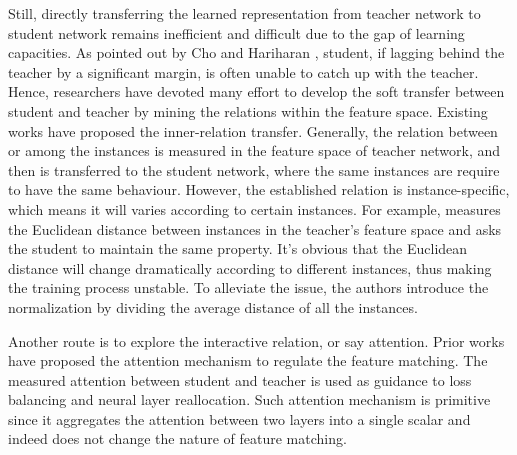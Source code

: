 \documentclass[10pt,twocolumn,letterpaper]{article}
\begin{document}
Still, directly transferring the learned representation from teacher network to student network remains inefficient and difficult due to the gap of learning capacities. As pointed out by Cho and Hariharan \cite{Cho2019OnTE}, student, if lagging behind the teacher by a significant margin, is often unable to catch up with the teacher. Hence, researchers have devoted many effort to develop the soft transfer between student and teacher by mining the relations within the feature space. Existing works \cite{Park2019RelationalKD, Passalis2018LearningDR,Peng2019CorrelationCF,Tung2019SimilarityPreservingKD} have proposed the inner-relation transfer. Generally, the relation between or among the instances is measured in the feature space of teacher network, and then is transferred to the student network, where the same instances are require to have the same behaviour. However, the established relation is instance-specific, which means it will varies according to certain instances. For example, \cite{Park2019RelationalKD} measures the Euclidean distance between instances in the teacher's feature space and asks the student to maintain the same property. It's obvious that the Euclidean distance will change dramatically according to different instances, thus making the training process unstable. To alleviate the issue, the authors introduce the normalization by dividing the average distance of all the instances.

Another route is to explore the interactive relation, or say attention. Prior works \cite{Ji2021ShowAA,Chen2020CrossLayerDW} have proposed the attention mechanism to regulate the feature matching. The measured attention between student and teacher is used as guidance to loss balancing and neural layer reallocation. Such attention mechanism is primitive since it aggregates the attention between two layers into a single scalar and indeed does not change the nature of feature matching.


\end{document}
